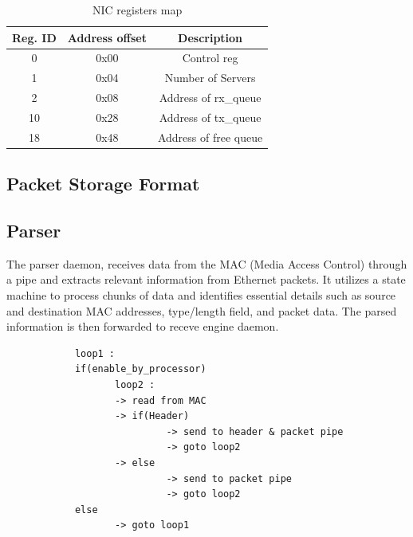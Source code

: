 \documentclass[a4paper,11pt, final]{report}
\begin{document}
			\begin{table}[htbp]
				\centering
				\begin{tabular}{|c|c|c|}
					\hline
					Reg. ID& Address offset & Description  \\ \hline
					0  & 0x00  & Control reg    \\ \hline
					1  & 0x04  & Number of Servers    \\ \hline
					2  & 0x08  & Address of rx\_queue    \\ \hline
					10  & 0x28  & Address of tx\_queue    \\ \hline
					18  & 0x48  & Address of free queue    \\ \hline
				\end{tabular}
				\caption{NIC registers map}
				\label{tab:NIC_REG}
			\end{table}

		\subsection{Packet Storage Format}

		\subsection{Parser}
				The parser daemon, receives data from the MAC (Media Access Control) through a pipe and extracts relevant information from Ethernet packets. It utilizes a state machine to process chunks of data and identifies essential details such as source and destination MAC addresses, type/length field, and packet data. The parsed information is then forwarded to receve engine daemon.
		\begin{verbatim}
			loop1 :
			if(enable_by_processor)
			       loop2 :
			       -> read from MAC
			       -> if(Header) 
			                -> send to header & packet pipe
			                -> goto loop2
			       -> else
			       	        -> send to packet pipe
			       	        -> goto loop2
			else
			       -> goto loop1
		\end{verbatim}
\end{document}
